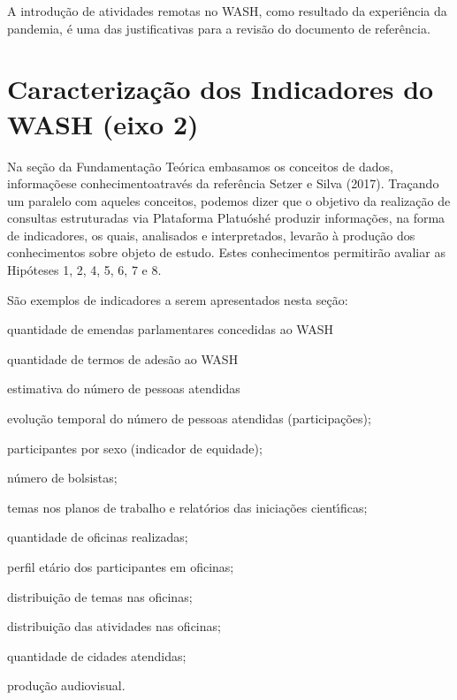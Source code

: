 \documentclass[
12pt,		%
openright,	%
twoside,  %
a4paper,			%
chapter=TITLE,		%
english,			%
french,				%
spanish,			%
brazil				%
]{USPSC-classe/USPSC}
\begin{document}
A introdu\c{c}\~ao de atividades remotas no WASH, como resultado da experi\^encia da pandemia, \'e uma das justificativas para a revis\~ao do documento de refer\^encia.










\section[Caracteriza\c{c}\~ao dos Indicadores do WASH (eixo 2)]{Caracteriza\c{c}\~ao dos Indicadores do WASH (eixo 2)}\label{Caracteriza\c{c}\~ao dos Indicadores do WASH (eixo 2)}
Na se\c{c}\~ao da Fundamenta\c{c}\~ao Te\'orica embasamos os conceitos de \textquotedbl dados\textquotedbl , \textquotedbl informa\c{c}\~oes\textquotedbl  e \textquotedbl conhecimento\textquotedbl   atrav\'es da refer\^encia  Setzer e Silva (2017). Tra\c{c}ando um paralelo com aqueles conceitos, podemos dizer que o objetivo da realiza\c{c}\~ao de consultas estruturadas via Plataforma \textquotedbl Platu\'osh\textquotedbl  \'e produzir informa\c{c}\~oes, na forma de indicadores, os quais, analisados e interpretados, levar\~ao \`a produ\c{c}\~ao dos conhecimentos sobre objeto de estudo. Estes conhecimentos permitir\~ao avaliar as Hip\'oteses 1, 2, 4, 5, 6, 7 e 8.










S\~ao exemplos de indicadores a serem apresentados nesta se\c{c}\~ao:











\begin{alineas}
\item quantidade de emendas parlamentares concedidas ao WASH
\item quantidade de termos de ades\~ao ao WASH
\item estimativa do n\'umero de pessoas atendidas
\item evolu\c{c}\~ao temporal do n\'umero de pessoas atendidas (participa\c{c}\~oes);
\item participantes por sexo (indicador de equidade);
\item n\'umero de bolsistas;
\item temas nos planos de trabalho e relat\'orios das inicia\c{c}\~oes cient\'{\i}ficas;
\item quantidade de oficinas realizadas;
\item perfil et\'ario dos participantes em oficinas;
\item distribui\c{c}\~ao de temas nas oficinas;
\item distribui\c{c}\~ao das atividades nas oficinas;
\item quantidade de cidades atendidas;
\item produ\c{c}\~ao audiovisual.
\end{alineas}
\end{document}
